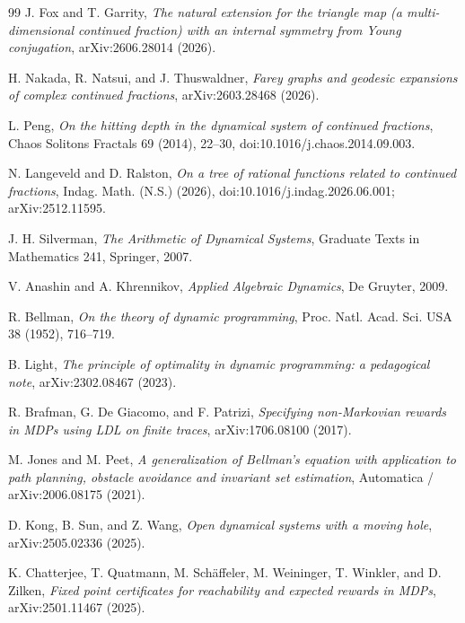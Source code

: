 \documentclass[11pt]{amsart}
\theoremstyle{definition}
\begin{document}
\begin{thebibliography}{99}
J. Fox and T. Garrity,
\emph{The natural extension for the triangle map (a multi-dimensional continued fraction) with an internal symmetry from Young conjugation},
arXiv:2606.28014 (2026).

H. Nakada, R. Natsui, and J. Thuswaldner,
\emph{Farey graphs and geodesic expansions of complex continued fractions},
arXiv:2603.28468 (2026).

L. Peng,
\emph{On the hitting depth in the dynamical system of continued fractions},
Chaos Solitons Fractals 69 (2014), 22--30,
doi:10.1016/j.chaos.2014.09.003.

N. Langeveld and D. Ralston,
\emph{On a tree of rational functions related to continued fractions},
Indag. Math. (N.S.) (2026),
doi:10.1016/j.indag.2026.06.001; arXiv:2512.11595.

J. H. Silverman,
\emph{The Arithmetic of Dynamical Systems},
Graduate Texts in Mathematics 241, Springer, 2007.

V. Anashin and A. Khrennikov,
\emph{Applied Algebraic Dynamics},
De Gruyter, 2009.

R. Bellman,
\emph{On the theory of dynamic programming},
Proc. Natl. Acad. Sci. USA 38 (1952), 716--719.

B. Light,
\emph{The principle of optimality in dynamic programming: a pedagogical note},
arXiv:2302.08467 (2023).

R. Brafman, G. De Giacomo, and F. Patrizi,
\emph{Specifying non-Markovian rewards in MDPs using LDL on finite traces},
arXiv:1706.08100 (2017).

M. Jones and M. Peet,
\emph{A generalization of Bellman's equation with application to path planning, obstacle avoidance and invariant set estimation},
Automatica / arXiv:2006.08175 (2021).

D. Kong, B. Sun, and Z. Wang,
\emph{Open dynamical systems with a moving hole},
arXiv:2505.02336 (2025).

K. Chatterjee, T. Quatmann, M. Sch\"affeler, M. Weininger, T. Winkler, and D. Zilken,
\emph{Fixed point certificates for reachability and expected rewards in MDPs},
arXiv:2501.11467 (2025).

\end{thebibliography}
\end{document}
